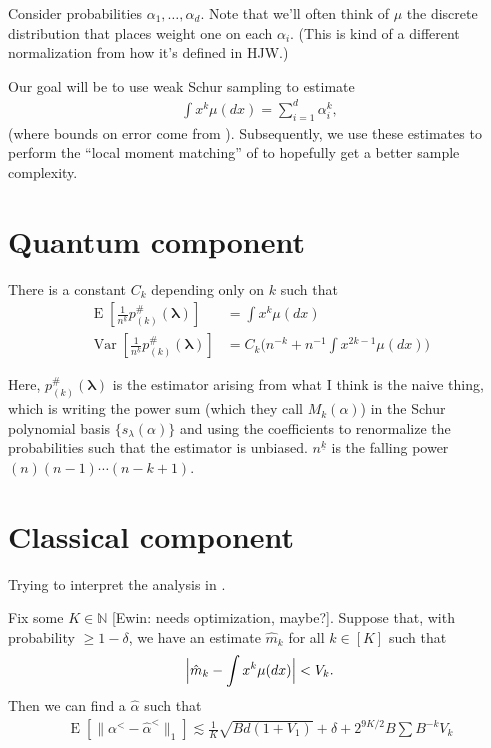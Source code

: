 \documentclass{article}
\theoremstyle{definition}
\DeclareMathOperator{\E}{E}
\DeclareMathOperator{\Var}{Var}
\DeclarePairedDelimiter{\abs}{\lvert}{\rvert}
\newcommand{\ewin}[1]{\textrm{\textcolor[RGB]{0,135,219}{[Ewin: #1]}}}
\begin{document}
Consider probabilities $\alpha_1,\ldots,\alpha_d$.
Note that we'll often think of $\mu$ the discrete distribution that places weight one on each $\alpha_i$.
(This is kind of a different normalization from how it's defined in HJW.)

Our goal will be to use weak Schur sampling to estimate
\begin{align*}
    \int x^k \mu(dx) = \sum_{i=1}^d \alpha_i^k,
\end{align*}
(where bounds on error come from \cite{aisw19}).
Subsequently, we use these estimates to perform the ``local moment matching'' of \cite{hjw18} to hopefully get a better sample complexity.

\section{Quantum component}

\begin{lemma}
    There is a constant $C_k$ depending only on $k$ such that
    \begin{align}
        \E[\frac{1}{n^{\underline{k}}}p_{(k)}^{\#}(\bm{\lambda})] &= \int x^k\mu(dx) \\
        \Var[\frac{1}{n^{\underline{k}}}p_{(k)}^{\#}(\bm{\lambda})] &= C_k\Big(n^{-k} + n^{-1}\int x^{2k-1}\mu(dx)\Big)
    \end{align}
\end{lemma}

Here, $p_{(k)}^\#(\bm{\lambda})$ is the estimator arising from what I think is the naive thing, which is writing the power sum (which they call $M_k(\alpha)$) in the Schur polynomial basis $\{s_\lambda(\alpha)\}$ and using the coefficients to renormalize the probabilities such that the estimator is unbiased. $n^{\underline{k}}$ is the falling power $(n)(n-1)\cdots(n-k+1)$.

\section{Classical component}

Trying to interpret the analysis in \cite{hjw18}.

\begin{theorem}
Fix some $K \in \mathbb{N}$ \ewin{needs optimization, maybe?}.
Suppose that, with probability $\geq 1-\delta$, we have an estimate $\hat{m}_k$ for all $k \in [K]$ such that
\begin{align*}
    \abs[\Big]{\hat{m}_k - \int x^k \mu(dx)} < V_k.
\end{align*}
Then we can find a $\hat{\alpha}$ such that
\begin{align*}
    \E[\|\alpha^< - \hat{\alpha}^<\|_1] \lesssim \frac1K\sqrt{Bd(1+V_1)} + \delta + 2^{9K/2}B\sum B^{-k}V_k
\end{align*}
\end{theorem}
\end{document}
